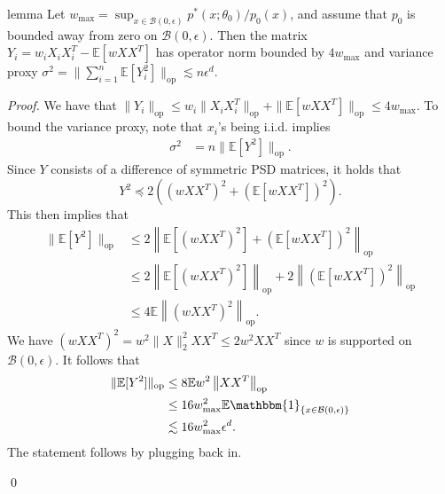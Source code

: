 \documentclass[11pt]{article}
\begin{document}
\begin{restatable}{lemma}{}\label{lemma: operator norm and var proxy}
    Let $w_{\max} = \sup_{x \in \mathcal{B}(0, \epsilon)}p^*(x; \theta_0)/p_0(x)$, and assume that $p_0$ is bounded away from zero on $\mathcal{B}(0, \epsilon)$. Then the matrix $Y_i = w_iX_iX_i^T - \mathbb{E}[wXX^T]$ has operator norm bounded by $4w_{\max}$ and variance proxy $\sigma^2 = \|\sum_{i = 1}^n \mathbb{E}[Y_i^2]\|_{\text{op}} \lesssim n\epsilon^d$. 
\end{restatable} 
\noindent \textit{Proof.} We have that $\|Y_i\|_{\text{op}} \leq w_i\|X_iX_i^T\|_{\text{op}}  + \|\mathbb{E}[wXX^T]\|_{\text{op}} \leq 4w_{\max}$. To bound the variance proxy, note that $x_i$'s being i.i.d. implies
\begin{align*}
    \sigma^2 &= n\| \mathbb{E}[Y^2]\|_{\text{op}}.
\end{align*}
Since $Y$ consists of a difference of symmetric PSD matrices, it holds that \[Y^2 \preceq 2\left((wXX^T)^2 + (\mathbb{E}[wXX^T])^2\right).\] This then implies that
\begin{align*}
    \|\mathbb{E}[Y^2]\|_{\text{op}} &\leq 2\left\|\mathbb{E}[(wXX^T)^2] + (\mathbb{E}[wXX^T])^2\right\|_{\text{op}} \\
    &\leq 2\left\|\mathbb{E}[(wXX^T)^2]\right\|_{\text{op}} + 2\left\|(\mathbb{E}[wXX^T])^2\right\|_{\text{op}} \\
    &\leq 4\mathbb{E}\left\|(wXX^T)^2\right\|_{\text{op}} \tag{Jensen's Inequality}.
\end{align*}
We have $(wXX^T)^2 = w^2\|X\|_2^2XX^T \leq 2w^2XX^T$ since $w$ is supported on $\mathcal{B}(0, \epsilon)$. It follows that
\begin{align*}
    \|\mathbb{E}[Y^2]\|_{\text{op}} &\leq 8\mathbb{E}w^2\left\|XX^T\right\|_{\text{op}} \\
    &\leq16w_{\max}^2 \mathbb{E}\mathbbm{1}_{\{x \in \mathcal{B}(0, \epsilon)\}} \\
    &\lesssim 16w_{\max}^2\epsilon^d.
\end{align*}
The statement follows by plugging back in.

\qed{}
\end{document}
